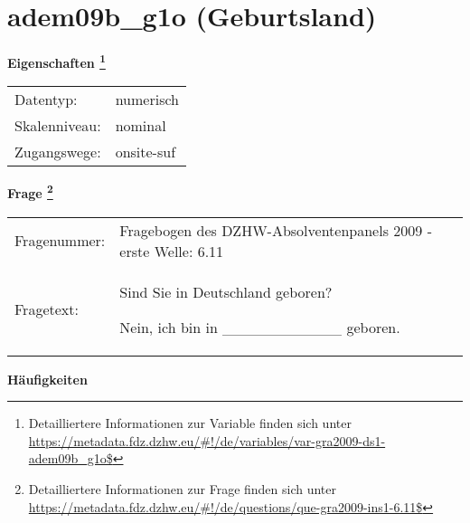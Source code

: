 
    \setcounter{footnote}{0}

    \vspace*{-1.8cm}
	\section{adem09b\_g1o (Geburtsland)}
	\label{section:adem09b_g1o}



    \vspace*{0.5cm}
    \noindent\textbf{Eigenschaften
	\footnote{Detailliertere Informationen zur Variable finden sich unter
		\url{https://metadata.fdz.dzhw.eu/\#!/de/variables/var-gra2009-ds1-adem09b_g1o$}}}\\
	\begin{tabularx}{\hsize}{@{}lX}
	Datentyp: & numerisch \\
	Skalenniveau: & nominal \\
	Zugangswege: &
	  onsite-suf
 \\
    \end{tabularx}



				\vspace*{0.5cm}
                \noindent\textbf{Frage
	                \footnote{Detailliertere Informationen zur Frage finden sich unter
		              \url{https://metadata.fdz.dzhw.eu/\#!/de/questions/que-gra2009-ins1-6.11$}}}\\
				\begin{tabularx}{\hsize}{@{}lX}
					Fragenummer: &
					  Fragebogen des DZHW-Absolventenpanels 2009 - erste Welle:
					  6.11
 \\
					Fragetext: & Sind Sie in Deutschland geboren?\par  Nein, ich bin in \_\_\_\_\_\_\_\_\_\_\_ geboren. \\
				\end{tabularx}





        		\vspace*{0.5cm}
                \noindent\textbf{Häufigkeiten}


